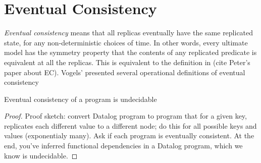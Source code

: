 \section{Eventual Consistency}

{\em Eventual consistency} means that all replicas eventually have the same replicated state, for any non-deterministic choices of time.  In other words, every ultimate model has the symmetry property that the contents of any replicated predicate is equivalent at all the replicas.  This is equivalent to the definition in (cite Peter's paper about EC).  Vogels' presented several operational definitions of eventual consistency 

\begin{lemma}
Eventual consistency of a \lang program is undecidable
\end{lemma}
\begin{proof}
Proof sketch: convert Datalog program to \lang program that for a given key, replicates each different value to a different node; do this for all possible keys and values (exponentialy many).  Ask if each program is eventually consistent.  At the end, you've inferred functional dependencies in a Datalog program, which we know is undecidable.
\end{proof}
